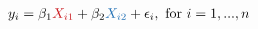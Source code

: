 \documentclass[10pt]{article}
\begin{document}
\begin{align*}y_i = \beta_1 {\color[rgb]{0.792157,0.090196,0.109804}X_{i1}} + \beta_2 {\color[rgb]{0.129412,0.439216,0.709804}X_{i2}} + \epsilon_i , \ \mathrm{for}\ i  =  1,...,n\end{align*}
\end{document}

